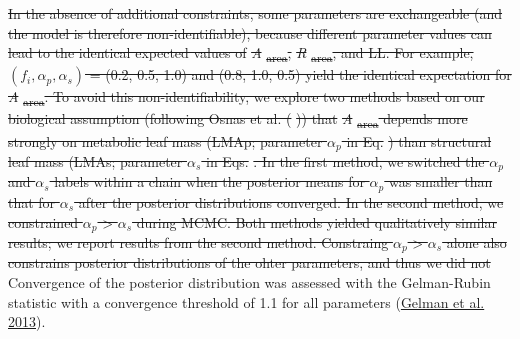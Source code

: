 \documentclass[
  12pt,
  a4paper,
,tablecaptionabove
]{scrartcl}
\providecommand{\DIFdeltex}[1]{{\protect\color{red}\sout{#1}}}                      %
\providecommand{\DIFdelend}{} %
\providecommand{\DIFdel}[1]{\texorpdfstring{\DIFdeltex{#1}}{}} %
\DeclareRobustCommand{\DIFdelend}{\DIFOaddend \let\includegraphics\DIFOincludegraphics} %
\begin{document}
\DIFdel{In the absence of additional constraints, some parameters are exchangeable (and the model is therefore non-identifiable), because different parameter values can lead to the identical expected values of }\emph{\DIFdel{A}}%
\DIFdel{\textsubscript{area}, }\emph{\DIFdel{R}}%
\DIFdel{\textsubscript{area}, and LL.
For example, \((f_i, \alpha_p, \alpha_s)\) = (0.2, 0.5, 1.0) and (0.8, 1.0, 0.5) yield the identical expectation for }\emph{\DIFdel{A}}%
\DIFdel{\textsubscript{area}.
To avoid this non-identifiability, we explore two methods based on our biological assumption (following Osnas et al. (}%
\DIFdel{)) that }\emph{\DIFdel{A}}%
\DIFdel{\textsubscript{area} depends more strongly on metabolic leaf mass (LMAp; parameter \(\alpha_p\) in Eq. }%
\DIFdel{) than structural leaf mass (LMAs; parameter \(\alpha_s\) in Eqs. }%
\DIFdel{.
In the first method, we switched the \(\alpha_p\) and \(\alpha_s\) labels within a chain when the posterior means for \(\alpha_p\) was smaller than that for \(\alpha_s\) after the posterior distributions converged.
In the second method, we constrained \(\alpha_p\) \textgreater{} \(\alpha_s\) during MCMC.
Both methods yielded qualitatively similar results; we report results from the second method.
Constraing \(\alpha_p\) \textgreater{} \(\alpha_s\) alone also constrains posterior distributions of the ohter parameters, and thus we did not
}\DIFdelend Convergence of the posterior distribution was assessed with the Gelman-Rubin statistic with a convergence threshold of 1.1 for all parameters (\protect\hyperlink{ref-Gelman2013}{Gelman et al. 2013}).
\end{document}
